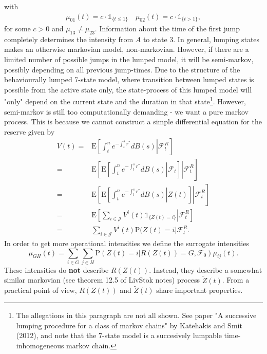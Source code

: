 \documentclass[12pt]{article}
\newcommand{\E}{\text{E}}
\newcommand{\indic}[1]{\mathds{1}_{ \{ #1 \} }}
\newcommand{\noin}{\noindent}
\renewcommand{\P}{\text{P}}
\theoremstyle{my_thm}
\begin{document}
\noin with 
\begin{gather*}
\mu_{01}(t)=c \cdot \indic{t \leq 1} \quad \mu_{02}(t)=c \cdot  \indic{t > 1},
\end{gather*}
for some $c>0$ and $\mu_{13}\neq \mu_{23}$. Information about the time of the first jump completely determines the intensity from $A$ to state 3. In general, lumping states makes an otherwise markovian model, non-markovian. However, if there are a limited number of possible jumps in the lumped model, it will be semi-markov, possibly depending on all previous jump-times. Due to the structure of the behaviourally lumped 7-state model, where transition between lumped states is possible from the active state only, the state-process of this lumped model will "only" depend on the current state and the duration in that state\footnote{The allegations in this paragraph are not all shown. See paper "A successive lumping procedure for a class of markov chains" by Katehakis and Smit (2012), and note that the 7-state model is a succesively lumpable time-inhomogeneous markov chain.}. However, semi-markov is still too computationally demanding - we want a pure markov process. This is because we cannot construct a simple differential equation for the reserve given by
\begin{align*}
V(t)=& \E \left. \left[ \int_t^n e^{-\int_t^sr^*} dB(s) \right| \mathcal{F}_t^R \right]
\\
=& \E \left.\left[ \E \left.  \left[ \int_t^n e^{-\int_t^sr^*} dB(s) \right| \mathcal{F}_t \right] \right| \mathcal{F}_t^R \right]
\\
=& \E \left.\left[ \E \left.  \left[ \int_t^n e^{-\int_t^sr^*} dB(s) \right| Z(t) \right] \right| \mathcal{F}_t^R \right]
\\
=& \E \left.\left[  \sum_{i \in \mathcal{J}} V^i(t) \indic{Z(t)=i} \right| \mathcal{F}_t^R \right]
\\
=&  \sum_{i \in \mathcal{J}} V^i(t) \P(Z(t)=i| \mathcal{F}_t^R.
\end{align*}
In order to get more operational intensities we define the surrogate intensities
$$
\mu_{GH}(t)=\sum_{i \in G}\sum_{j \in H} \P(Z(t)=i |R(Z(t)) = G, \mathcal{F}_0) \mu_{ij}(t).
$$
These intensities do \textbf{not} describe $R(Z(t))$. Instead, they describe a somewhat similar markovian (see theorem 12.5 of LivStok notes) process $\tilde{Z}(t)$. From a practical point of view, $R(Z(t))$ and $\tilde{Z}(t)$ share important properties. 
\end{document}
